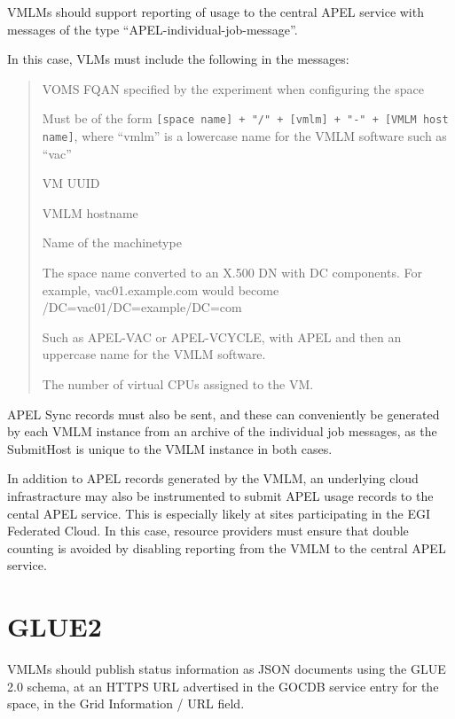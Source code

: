 \documentclass[12pt,a4paper]{article}
\begin{document}
VMLMs should support reporting of usage to the central APEL service
with messages of the type ``APEL-individual-job-message''.

In this case, VLMs must include the following in the messages:
\begin{quote}
\begin{description}
\setlength{\parskip}{0pt}
\item[FQAN] VOMS FQAN specified by the experiment when configuring the space
\item[SubmitHost] Must be of the form 
  \texttt{[space name] + "/" + [vmlm] + "-" + [VMLM host name]}, where
  ``vmlm'' is a lowercase name for the VMLM software such as ``vac''
\item[LocalJobId] VM UUID
\item[LocalUserId] VMLM hostname
\item[Queue] Name of the machinetype
\item[GlobalUserName] The space name converted to an X.500 DN with DC
  components. For example, vac01.example.com would become /DC=vac01/DC=example/DC=com
\item[InfrastructureDescription] Such as APEL-VAC or APEL-VCYCLE, with APEL and then
  an uppercase name for the VMLM software.
\item[Processors] The number of virtual CPUs assigned to the VM.
\end{description}
\end{quote}

APEL Sync records must also be sent, and these can conveniently be
generated by each VMLM instance from an archive of the individual
job messages, as the SubmitHost is unique to the VMLM instance
in both cases.

In addition to APEL records generated by the VMLM, an underlying
cloud infrastracture may also be instrumented to submit APEL usage records
to the cental APEL service.
This is especially likely at sites participating in the EGI Federated Cloud.
In this case, resource providers must ensure that double counting is avoided
by disabling reporting from the VMLM to the central APEL service. 

\section{GLUE2}
\label{sec:glue2}

VMLMs should publish status information as JSON documents using the GLUE 2.0 
schema, at an HTTPS URL advertised in the GOCDB service entry for the space,
in the Grid Information / URL field.
\end{document}
